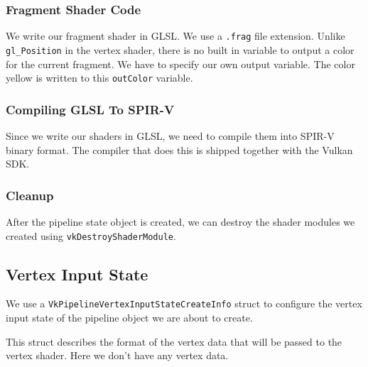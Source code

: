\begin{minipage}{\linewidth}{\noindent}
    
\end{minipage}

\subsubsection{Fragment Shader Code}

We write our fragment shader in GLSL.
We use a \texttt{.frag} file extension.
Unlike \texttt{gl\_Position} in the vertex shader, there is no built in
variable to output a color for the current fragment.
We have to specify our own output variable.
The color yellow is written to this \texttt{outColor} variable.

\begin{minipage}{\linewidth}{\noindent}
    
\end{minipage}

\subsubsection{Compiling GLSL To SPIR-V}

Since we write our shaders in GLSL, we
need to compile them into SPIR-V binary format.
The compiler that does this is shipped together with the Vulkan SDK.

\subsubsection{Cleanup}

After the pipeline state object is created, we can destroy the shader modules
we created using \texttt{vkDestroyShaderModule}.

\subsection{Vertex Input State}

We use a \texttt{VkPipelineVertexInputStateCreateInfo} struct to configure the
vertex input state of the pipeline object we are about to create.

This struct describes the format of the vertex data that will be passed
to the vertex shader.
Here we don't have any vertex data.

